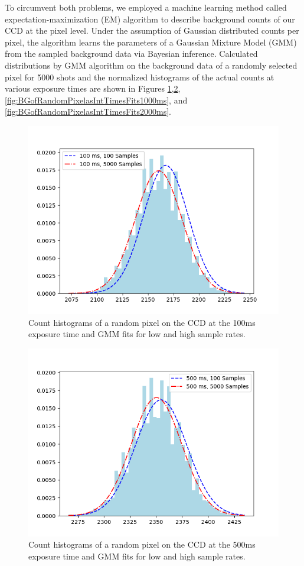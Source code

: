 To circumvent both problems, we employed a machine learning method called 
expectation-maximization (EM) algorithm to describe background counts of our CCD 
at the pixel level. Under the assumption of Gaussian distributed counts per pixel, 
the algorithm learns the parameters of a Gaussian Mixture Model (GMM) from 
the sampled background data via Bayesian inference. Calculated distributions by GMM
algorithm on the background data of a randomly selected pixel for 5000 shots and the normalized
histograms of the actual counts at various exposure times are shown in Figures
\ref{fig:BGofRandomPixelasIntTimesFits100ms},\ref{fig:BGofRandomPixelasIntTimesFits500ms},
\ref{fig:BGofRandomPixelasIntTimesFits1000ms}, and \ref{fig:BGofRandomPixelasIntTimesFits2000ms}.

\begin{figure}[H]
	\centering
	\includegraphics[angle=0,origin=c,width = 0.8\linewidth]{Section_ODMR/Figures/Pixel2550_100msFits.png}
	\caption{Count histograms of a random pixel on the CCD at the 100ms exposure time and GMM fits for low and high
		 sample rates.}
	\label{fig:BGofRandomPixelasIntTimesFits100ms}
\end{figure}

\begin{figure}[H]
	\centering
	\includegraphics[angle=0,origin=c,width = 0.8\linewidth]{Section_ODMR/Figures/Pixel2550_500msFits.png}
	\caption{Count histograms of a random pixel on the CCD at the 500ms exposure time and GMM fits for low and high
		sample rates.}
	\label{fig:BGofRandomPixelasIntTimesFits500ms}
\end{figure}

